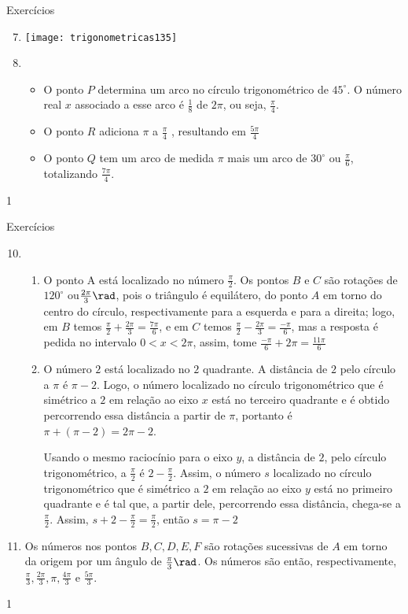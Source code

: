 \clearmargin
\begin{answer}{Exercícios}
{\exerciselist
\begin{enumerate}\setcounter{enumi}{6}
\item {}
{
\texttt{[image: trigonometricas135]}
}
\item 
\begin{itemize}
\item O ponto $P$ determina um arco no círculo trigonométrico de $45^{\circ}$. O número real $x$ associado a esse arco é $\frac{1}{8}$ de $2\pi$, ou seja, $\frac{\pi}{4}$.
\item O ponto $R$ adiciona $\pi$ a $\frac{\pi}{4}$ , resultando em $\frac{5\pi}{4}$
\item O ponto $Q$ tem um arco de medida $\pi$ mais um arco de $30^{\circ}$ ou $\frac{\pi}{6}$, totalizando $\frac{7\pi}{4}$.
\end{itemize}
\end{enumerate}
}{1}
\end{answer}
\clearmargin
\begin{answer}{Exercícios}
{\exerciselist
\begin{enumerate}\setcounter{enumi}{9}
\item 
\begin{enumerate}
\item O ponto A está localizado no número $\frac{\pi}{2}$. Os pontos $B$ e $C$ são rotações de $120^{\circ}$ ou$\frac{2\pi}{3}\rad$, pois o triângulo é equilátero, do ponto $A$ em torno do centro do círculo, respectivamente para a esquerda e para a direita; logo, em $B$ temos $\frac{\pi}{2}+\frac{2\pi}{3}=\frac{7\pi}{6}$, e em $C$ temos $\frac{\pi}{2}-\frac{2\pi}{3}=\frac{-\pi}{6}$, mas a resposta é pedida no intervalo 0$<x<2\pi$, assim, tome $\frac{-\pi}{6}+2\pi=\frac{11\pi}{6}$

\item O número $2$ está localizado no $2$ quadrante. A distância de $2$ pelo círculo a $\pi$ é $\pi-2$. Logo, o número localizado no círculo trigonométrico que é simétrico a $2$ em relação ao eixo $x$ está no terceiro quadrante e é obtido percorrendo essa distância a partir de $\pi$, portanto é $\pi+(\pi-2)=2\pi-2$.

Usando o mesmo raciocínio para o eixo $y$, a distância de $2$, pelo círculo trigonométrico, a $\frac{\pi}{2}$ é $2-\frac{\pi}{2}$. Assim, o número $s$ localizado no círculo trigonométrico que é simétrico a $2$ em relação ao eixo $y$ está no primeiro quadrante e é tal que, a partir dele, percorrendo essa distância, chega-se a $\frac{\pi}{2}$. Assim, $s+2-\frac{\pi}{2}=\frac{\pi}{2}$, então $s=\pi-2$
\end{enumerate}
\item Os números nos pontos $B, C, D, E, F$ são rotações sucessivas de $A$ em torno da origem por um ângulo de $\frac{\pi}{3}\rad$. Os números são então, respectivamente, $\frac{\pi}{3},\frac{2\pi}{3},\pi,\frac{4\pi}{3}$ e $\frac{5\pi}{3}$.
\end{enumerate}
}{1}
\end{answer}

